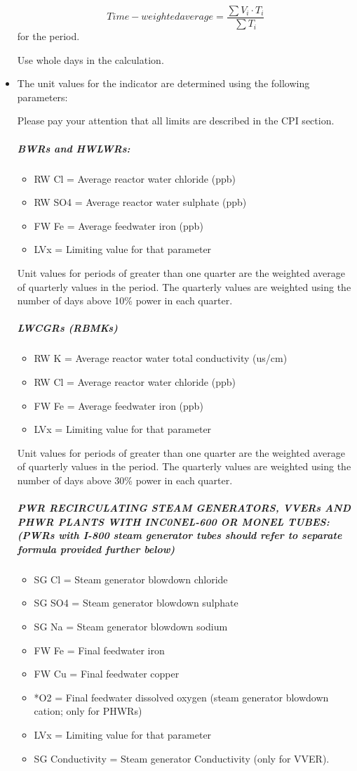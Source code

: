 \begin{itemize}
$$ Time-weighted average = \frac{\sum{V_i \cdot T_i}}{\sum{T_i}} $$
for the period.

Use whole days in the calculation.

\item The unit values for the indicator are determined using the
  following parameters:

Please pay your attention that all limits are described in the CPI
section.
\subparagraph{BWRs and HWLWRs:}
\begin{itemize}
\item RW Cl		=	Average reactor water chloride (ppb)
\item RW SO4	=	Average reactor water sulphate (ppb)
\item FW Fe		=	Average feedwater iron (ppb)
\item LVx		=	Limiting value for that parameter
\end{itemize}

Unit values for periods of greater than one quarter are the weighted
average of quarterly values in the period. The quarterly values are
weighted using the number of days above 10\% power in each quarter.

\subparagraph{LWCGRs (RBMKs)}
\begin{itemize}
\item RW K		=	Average reactor water total conductivity (us/cm)
\item RW Cl		=	Average reactor water chloride (ppb)
\item FW Fe		=	Average feedwater iron (ppb)
\item LVx		=	Limiting value for that parameter
\end{itemize}

Unit values for periods of greater than one quarter are the weighted
average of quarterly values in the period. The quarterly values are
weighted using the number of days above 30\% power in each quarter.

\subparagraph{PWR RECIRCULATING STEAM GENERATORS, VVERs AND PHWR
  PLANTS WITH INC0NEL-600 OR MONEL TUBES:  (PWRs with I-800 steam
  generator tubes should refer to separate formula provided further
  below)}
\begin{itemize}
\item SG Cl		=	Steam generator blowdown chloride
\item SG SO4		=	Steam generator blowdown sulphate
\item SG Na		=	Steam generator blowdown sodium
\item FW Fe		=	Final feedwater iron
\item FW Cu		=	Final feedwater copper
\item *O2		=	Final feedwater dissolved oxygen (steam generator blowdown cation; only for PHWRs)
\item LVx		=	Limiting value for that parameter
\item SG Conductivity = 	Steam generator Conductivity (only for
  VVER).
\end{itemize}


\end{itemize}
